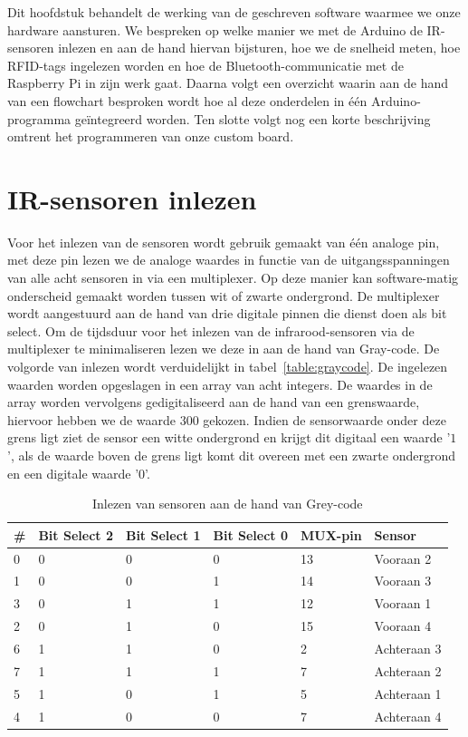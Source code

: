Dit hoofdstuk behandelt de werking van de geschreven software waarmee we onze hardware aansturen. We bespreken op welke manier we met de Arduino de IR-sensoren inlezen en aan de hand hiervan bijsturen, hoe we de snelheid meten, hoe RFID-tags ingelezen worden en hoe de Bluetooth-communicatie met de Raspberry Pi in zijn werk gaat. Daarna volgt een overzicht waarin aan de hand van een flowchart besproken wordt hoe al deze onderdelen in \'e\'en Arduino-programma ge\"integreerd worden. Ten slotte volgt nog een korte beschrijving omtrent het programmeren van onze custom board.

\section{IR-sensoren inlezen}
Voor het inlezen van de sensoren wordt gebruik gemaakt van \'e\'en analoge pin, met deze pin lezen we de analoge waardes in functie van de uitgangsspanningen van alle acht sensoren in via een multiplexer. Op deze manier kan software-matig onderscheid gemaakt worden tussen wit of zwarte ondergrond. De multiplexer wordt aangestuurd aan de hand van drie digitale pinnen die dienst doen als bit select. Om de tijdsduur voor het inlezen van de infrarood-sensoren via de multiplexer te minimaliseren lezen we deze in aan de hand van Gray-code. De volgorde van inlezen wordt verduidelijkt in tabel~\vref{table:graycode}. De ingelezen waarden worden opgeslagen in een array van acht integers. De waardes in de array worden vervolgens gedigitaliseerd aan de hand van een grenswaarde, hiervoor hebben we de waarde $300$ gekozen. Indien de sensorwaarde onder deze grens ligt ziet de sensor een witte ondergrond en krijgt dit digitaal een waarde '$1$', als de waarde boven de grens ligt komt dit overeen met een zwarte ondergrond en een digitale waarde '$0$'. 

\begin{table}[H]
	\centering
	\begin{tabular}{|l|l|l|l|l|l|}
		\hline
		\# & Bit Select 2 & Bit Select 1 & Bit Select 0 & MUX-pin & Sensor      \\ \hline
		0  & 0            & 0            & 0            & 13      & Vooraan 2   \\ \hline
		1  & 0            & 0            & 1            & 14      & Vooraan 3   \\ \hline
		3  & 0            & 1            & 1            & 12      & Vooraan 1   \\ \hline
		2  & 0            & 1            & 0            & 15      & Vooraan 4   \\ \hline
		6  & 1            & 1            & 0            & 2       & Achteraan 3 \\ \hline
		7  & 1            & 1            & 1            & 7       & Achteraan 2 \\ \hline
		5  & 1            & 0            & 1            & 5       & Achteraan 1 \\ \hline
		4  & 1            & 0            & 0            & 7       & Achteraan 4 \\ \hline
	\end{tabular}
	\caption{Inlezen van sensoren aan de hand van Grey-code}
	\label{table:graycode}
\end{table}

